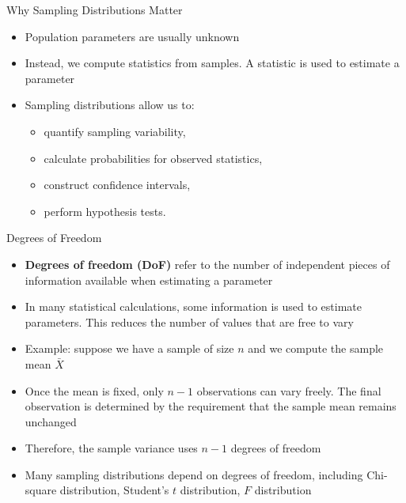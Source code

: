\documentclass[12pt, aspectratio=169]{beamer}
\begin{document}
    \begin{frame}{Why Sampling Distributions Matter}
        \begin{itemize}
            \item Population parameters are usually unknown
            \item Instead, we compute statistics from samples. A statistic is used to estimate a parameter
            \item Sampling distributions allow us to:
            \begin{itemize}
                \item quantify sampling variability,
                \item calculate probabilities for observed statistics,
                \item construct confidence intervals,
                \item perform hypothesis tests.
            \end{itemize}
        \end{itemize}
    \end{frame}


    \begin{frame}{Degrees of Freedom}
        \begin{itemize}
            \item \textbf{Degrees of freedom (DoF)} refer to the number of independent pieces of information available when estimating a parameter

            \item In many statistical calculations, some information is used to estimate parameters. This reduces the number of values that are free to vary

            \item Example: suppose we have a sample of size \(n\) and we compute the sample mean \(\bar{X}\)

            \item Once the mean is fixed, only \(n-1\) observations can vary freely. The final observation is determined by the requirement that the sample mean remains unchanged

            \item Therefore, the sample variance uses \(n-1\) degrees of freedom

            \item Many sampling distributions depend on degrees of freedom, including Chi-square distribution, Student's \(t\) distribution, \(F\) distribution
        \end{itemize}
    \end{frame}
\end{document}

